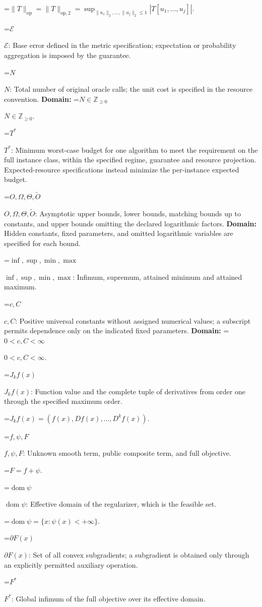 \documentclass[10pt,a4paper]{article}
\newcommand{\AtlasMath}[1]{\par\begingroup\centering\setbox0=\hbox{$\displaystyle #1$}\ifdim\wd0>1.4\linewidth\typeout{ATLAS WIDE FORMULA: \the\wd0}\fi\ifdim\wd0>\linewidth\resizebox{\linewidth}{!}{\box0}\else\box0\fi\par\endgroup}
\newcommand{\AtlasInlineMath}[1]{\begingroup\setbox0=\hbox{$#1$}\ifdim\wd0>.4\linewidth\endgroup\AtlasMath{#1}\else\endgroup$#1$\fi}
\begin{document}
\AtlasMath{\|T\|_{\mathrm{op}}=\|T\|_{\mathrm{op},2}=\sup_{\|u_1\|_2,\ldots,\|u_j\|_2\le1}|T[u_1,\ldots,u_j]|.}


\AtlasInlineMath{\mathcal{E}}: Base error defined in the metric specification; expectation or probability aggregation is imposed by the guarantee.

\AtlasInlineMath{N}: Total number of original oracle calls; the unit cost is specified in the resource convention. \textbf{Domain:} \AtlasInlineMath{N\in\mathbb{Z}_{\ge0}}.

\AtlasInlineMath{T^*}: Minimum worst-case budget for one algorithm to meet the requirement on the full instance class, within the specified regime, guarantee and resource projection. Expected-resource specifications instead minimize the per-instance expected budget.

\AtlasInlineMath{O,\Omega,\Theta,\widetilde{O}}: Asymptotic upper bounds, lower bounds, matching bounds up to constants, and upper bounds omitting the declared logarithmic factors. \textbf{Domain:} Hidden constants, fixed parameters, and omitted logarithmic variables are specified for each bound.

\AtlasInlineMath{\inf,\sup,\min,\max}: Infimum, supremum, attained minimum and attained maximum.

\AtlasInlineMath{c,C}: Positive universal constants without assigned numerical values; a subscript permits dependence only on the indicated fixed parameters. \textbf{Domain:} \AtlasInlineMath{0<c,C<\infty}.

\AtlasInlineMath{J_{k}f(x)}: Function value and the complete tuple of derivatives from order one through the specified maximum order.


\AtlasMath{J_{k}f(x)=(f(x),Df(x),\ldots,D^{k}f(x)).}


\AtlasInlineMath{f,\psi,F}: Unknown smooth term, public composite term, and full objective.


\AtlasMath{F=f+\psi.}


\AtlasInlineMath{\operatorname{dom}\psi}: Effective domain of the regularizer, which is the feasible set.


\AtlasMath{\operatorname{dom}\psi=\{x:\psi(x)<+\infty\}.}


\AtlasInlineMath{\partial F(x)}: Set of all convex subgradients; a subgradient is obtained only through an explicitly permitted auxiliary operation.

\AtlasInlineMath{F^*}: Global infimum of the full objective over its effective domain.
\end{document}
